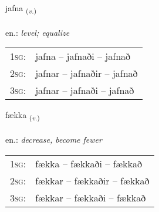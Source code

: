 \documentclass[frontgrid, backgrid]{flacards}\usepackage[]{graphicx}\usepackage[]{xcolor}
\begin{document}
\renewcommand{\blhead}{\vskip5pt {\small\bfseries\footnotesize Sagnorð | Verb }}
\renewcommand{\bcfoot}{\vskip5pt \hspace{2pt}{\small\bfseries\footnotesize 2K}}


{jafna \small{\textsubscript{(\textit{v.})}} \\[1ex] %
\textphonetic{[japna]} \\
en.: \emph{level; equalize} \\  [2ex]
\renewcommand*{\arraystretch}{0.8}
\begin{tabular}{p{1cm}l}
\textsc{1sg}: & jafna -- jafnaði -- jafnað \\ 
\textsc{2sg}: & jafnar -- jafnaðir -- jafnað \\ 
\textsc{3sg}: & jafnar -- jafnaði -- jafnað \\ 
\end{tabular}
}

\renewcommand{\flhead}{\vskip5pt \fboxsep=0pt {\small\bfseries\footnotesize Sagnorð | Verb}}
\renewcommand{\fcfoot}{\vskip5pt \fboxsep=0pt \hspace{2pt}{\small\bfseries\footnotesize 2K}}

\renewcommand{\blhead}{\vskip5pt {\small\bfseries\footnotesize Sagnorð | Verb }}
\renewcommand{\bcfoot}{\vskip5pt \hspace{2pt}{\small\bfseries\footnotesize 2K}}


{fækka \small{\textsubscript{(\textit{v.})}} \\[1ex] %
\textphonetic{[faihka]} \\
en.: \emph{decrease, become fewer} \\  [2ex]
\renewcommand*{\arraystretch}{0.8}
\begin{tabular}{p{1cm}l}
\textsc{1sg}: & fækka -- fækkaði -- fækkað \\ 
\textsc{2sg}: & fækkar -- fækkaðir -- fækkað \\ 
\textsc{3sg}: & fækkar -- fækkaði -- fækkað \\ 
\end{tabular}
}
\end{document}
